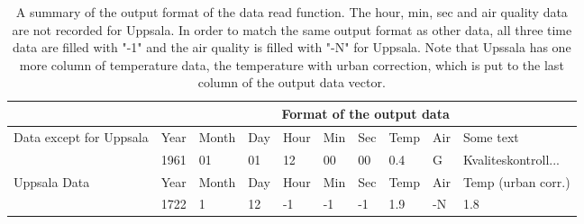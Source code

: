 \begin{table}[H]
\centering

\begin{tabular}{l|lllllllll}
\hline
  & \multicolumn{9}{c}{Format of the output data} \\ \hline\hline
\multirow{2}{1.9cm}{Data except for Uppsala} & Year & Month & Day & Hour & Min & Sec & Temp          & Air & Some text                  \\ \cline{2-10} 
                                         & 1961 & 01    & 01  & 12   & 00  & 00  & 0.4           & G           & Kvaliteskontroll... \\ \hline
\multirow{2}{1.9cm}{Uppsala Data}            & Year & Month & Day & Hour & Min & Sec & Temp & Air & Temp (urban corr.) \\ \cline{2-10} 
                                         & 1722 & 1     & 12  & -1   & -1  & -1  & 1.9           & -N          & 1.8                        \\ \hline
\end{tabular}
\caption{A summary of the output format of the data read function. The hour, min, sec and air quality data are not recorded for Uppsala. In order to match the same output format as other data, all three time data are filled with "-1" and the air quality is filled with "-N" for Uppsala. Note that Upssala has one more column of temperature data, the temperature with urban correction, which is put to the last column of the output data vector.}
\label{readDataOutPut}
\end{table}



































